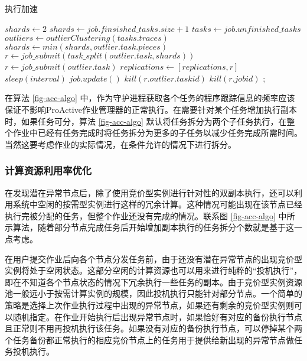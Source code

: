 \begin{algorithm}
\caption{执行加速}
\label{fig-acc-algo}
$shards\gets 2$\;
{
  {
    $shards\gets job.finsished\_tasks.size + 1$\;
  }
  $tasks\gets job.unfinished\_tasks$\;
  $outliers\gets outlierClustering(tasks.traces)$\;
  {
    {
      {
        $shards\gets min(shards, outlier.task.pieces)$\;
        $r\gets job\_submit(task\_split(outlier.task, shards))$\;
      }{
        $r\gets job\_submit(outlier.task)$\;
      }
      $replications\gets [replications, r]$\;
    }
  }
  $sleep(interval)$\;
  $job.update()$\;
  {
    {
      $kill(r.outlier.taskid)$\;
    }
    {
      $kill(r.jobid)$\;
    }
  }
}
;
\end{algorithm}

在算法 \ref{fig-acc-algo} 中，作为守护进程获取各个任务的程序跟踪信息的频率应该保证不影响ProActive作业管理器的正常执行。在需要针对某个任务增加执行副本时，如果任务可分，算法 \ref{fig-acc-algo} 默认将任务拆分为两个子任务执行，在整个作业中已经有任务完成时将任务拆分为更多的子任务以减少任务完成所需时间。当然这要考虑作业的实际情况，在条件允许的情况下进行拆分。

\subsubsection{计算资源利用率优化}
在发现潜在异常节点后，除了使用竞价型实例进行针对性的双副本执行，还可以利用系统中空闲的按需型实例进行这样的冗余计算。这种情况可能出现在该节点已经执行完被分配的任务，但整个作业还没有完成的情况。联系图 \ref{fig-acc-algo} 中所示算法，随着部分节点完成任务后开始增加副本执行的任务拆分个数就是基于这一点考虑。

在用户提交作业后向各个节点分发任务前，由于还没有潜在异常节点的出现竞价型实例将处于空闲状态。这部分空闲的计算资源也可以用来进行纯粹的``投机执行''，即在不知道各个节点状态的情况下冗余执行一些任务的副本。由于竞价型实例资源池一般远小于按需计算实例的规模，因此投机执行只能针对部分节点。一个简单的策略是选择上次作业执行过程中出现的异常节点，如果还有剩余的竞价型实例则可以随机指定。在作业开始执行后出现异常节点时，如果恰好有对应的备份执行节点且正常则不用再投机执行该任务。如果没有对应的备份执行节点，可以停掉某个两个任务备份都正常执行的相应竞价节点上的任务用于提供给新出现的异常节点做任务投机执行。

